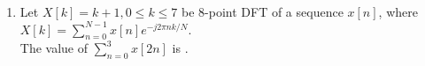 \documentclass[a4paper, 11pt]{article}
\begin{document}
\begin{enumerate}
    \hfill{}

    \item Let $X[k] = k+1, 0 \le k \le 7$ be 8-point DFT of a sequence $x[n]$, where $X[k] = \sum_{n=0}^{N-1} x[n]e^{-j2\pi nk/N}$.\\The value  of $\sum_{n=0}^{3} x[2n]$ is \underline{\hspace{2cm}}.

    \hfill{}

\end{enumerate}
\end{document}
